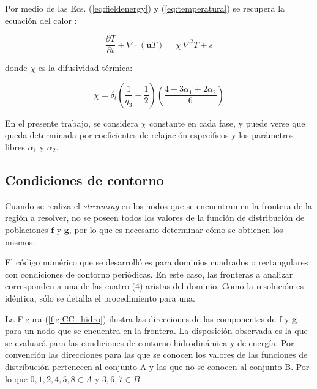 Por medio de las  Ecs. (\ref{eq:fieldenergy}) y (\ref{eq:temperatura}) se recupera la ecuación del calor \cite{markus2011simulation}:

\begin{equation}
    \frac{\partial T}{\partial t} + \nabla \cdot ( \mathbf{u} T ) = \chi \> {\nabla }^{2} T + s
    \label{eq:calor_ecu}
\end{equation}

donde $\chi$ es la difusividad térmica:

\begin{equation}
\chi = \delta_{t} \left( \frac{1}{q_{3}} - \frac{1}{2} \right) \left( \frac{ 4 + 3 \alpha_{1} + 2 \alpha_{2}}{6} \right)
\label{eq:chi}
\end{equation}

En el presente trabajo, se considera $\chi$ constante en cada fase, y puede verse que queda determinada por coeficientes de relajación específicos y los parámetros libres $\alpha_{1}$ y $\alpha_{2}$.


\subsection{Condiciones de contorno}

Cuando se realiza el \textit{streaming} en los nodos que se encuentran en la frontera de la región a resolver, no se poseen todos los valores de la función de distribución de poblaciones $\mathbf{f}$ y $\mathbf{g}$, por lo que es necesario determinar cómo se obtienen los mismos. 

El código numérico que se desarrolló es para dominios cuadrados o rectangulares con condiciones de contorno periódicas. En este caso, las fronteras a analizar corresponden a una de las cuatro (4) aristas del dominio. Como la resolución es idéntica, sólo se detalla el procedimiento para una.

La Figura (\ref{fig:CC_hidro}) ilustra las direcciones de las componentes de $\mathbf{f}$ y $\mathbf{g}$ para un nodo que se encuentra en la frontera. La disposición observada es la que se evaluará para las condiciones de contorno hidrodinámica y de energía.  Por convención las direcciones para las que se conocen los valores de las funciones de distribución pertenecen al conjunto A y las que no se conocen al conjunto B. Por lo que $ 0, 1, 2, 4, 5, 8 \in A$ y $ 3, 6, 7 \in B$. 

